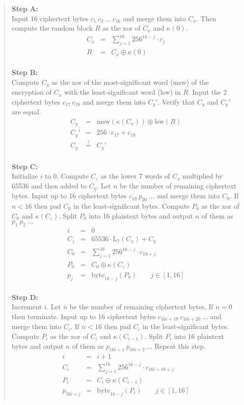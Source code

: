 \documentclass{article}
\newcommand{\xbyte}{\mathrm{byte}}
\newcommand{\xqeq}{\overset{?}{=}}
\begin{document}
\begin{quote}
\textbf{Step A:}\\
Input 16 ciphertext bytes $c_{1}\ c_{2}\ \ldots\ c_{16}$ and merge them into $C_x$.
Then compute the random block $R$ as the xor of $C_x$ and $\kappa(0)$.
\begin{eqnarray*}
  C_x &=& \sum_{j=1}^{16} 256^{16-j} \cdot c_{j} \\
  R &=& C_x \oplus \kappa(0) \\
\end{eqnarray*}

\textbf{Step B:}\\
Compute $C_y$ as the xor of the most-significant word (msw) 
of the encryption of $C_x$ with the least-significant word (lsw) in $R$.
Input the 2 ciphertext bytes $c_{17}\ c_{18}$ and merge them into $C_y'$.
Verify that $C_y$ and $C_y'$ are equal.
\begin{eqnarray*}
  C_y  &=& \mathrm{msw}(\kappa(C_x)) \oplus \mathrm{lsw}(R) \\
  C_y' &=& 256 \cdot c_{17} + c_{18} \\
  C_y  &\xqeq& C_y' \\
\end{eqnarray*}

\textbf{Step C:}\\
Initialize $i$ to 0.
Compute $C_z$ as the lower 7 words of $C_x$ multiplied by 65536 and then added to $C_y$.
Let $n$ be the number of remaining ciphertext bytes.
Input up to 16 ciphertext bytes $c_{19}\ p_{20}\ \ldots$ and merge them into $C_0$.
If $n<16$ then pad $C_0$ in the least-significant bytes.
Compute $P_0$ as the xor of $C_0$ and $\kappa(C_z)$.
Split $P_0$ into 16 plaintext bytes and output $n$ of them as $p_{1}\ p_{2}\ \ldots$
\begin{eqnarray*}
  i &=& 0 \\
  C_z &=& 65536 \cdot \mathrm{L}_7(C_x) + C_y  \\
  C_0 &=& \sum_{j=1}^{16} 256^{16-j} \cdot c_{18+j} \\
  P_0 &=& C_0 \oplus \kappa(C_z) \\
  p_j &=& \xbyte_{16-j}(P_0) \qquad j \in [1,16] \\
\end{eqnarray*}

\textbf{Step D:}\\
Increment $i$.
Let $n$ be the number of remaining ciphertext bytes.
If $n=0$ then terminate.
Input up to 16 ciphertext bytes $c_{16i+19}\ c_{16i+20}\ \ldots$ and merge them into $C_i$.
If $n<16$ then pad $C_i$ in the least-significant bytes.
Compute $P_i$ as the xor of $C_i$ and $\kappa(C_{i-1})$.
Split $P_i$ into 16 plaintext bytes and output $n$ of them as $p_{16i+1}\ p_{16i+2}\ \ldots$
Repeat this step.
\begin{eqnarray*}
  i &=& i + 1 \\
  C_i &=& \sum_{j=1}^{16} 256^{16-j} \cdot c_{16i+18+j} \\
  P_i &=& C_i \oplus \kappa(C_{i-1}) \\
  p_{16i+j} &=& \xbyte_{16-j}(P_i) \qquad j \in [1,16] \\
\end{eqnarray*}
\end{quote}
\end{document}
